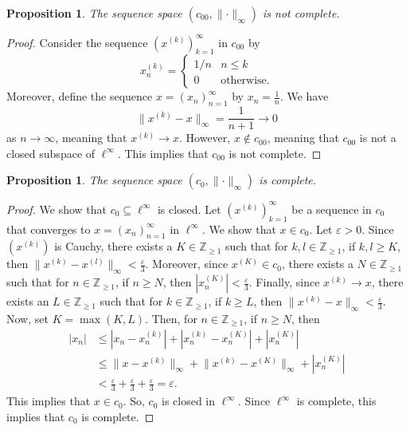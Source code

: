 \documentclass[a4paper, openany]{memoir}
\theoremstyle{definition}
\theoremstyle{plain}
\newtheorem{proposition}[definition]{Proposition}
\begin{document}
    \begin{proposition}
        The sequence space $(c_{00}, \lVert \cdot \rVert_\infty)$ is not complete.
    \end{proposition}
    \begin{proof}
        Consider the sequence $(x^{(k)})_{k=1}^\infty$ in $c_{00}$ by
        \[x^{(k)}_n = \begin{cases}
            1/n & n \leq k \\
            0 & \textrm{otherwise}.
        \end{cases}\]
        Moreover, define the sequence $x = (x_n)_{n=1}^\infty$ by $x_n = \frac{1}{n}$. We have
        \[\lVert x^{(k)} - x \rVert_\infty = \frac{1}{n+1} \to 0\]
        as $n \to \infty$, meaning that $x^{(k)} \to x$. However, $x \not\in c_{00}$, meaning that $c_{00}$ is not a closed subspace of $\ell^\infty$. This implies that $c_{00}$ is not complete.
    \end{proof}
    \begin{proposition}
        The sequence space $(c_0, \lVert \cdot \rVert_\infty)$ is complete.
    \end{proposition}
    \begin{proof}
        We show that $c_0 \subseteq \ell^\infty$ is closed. Let $(x^{(k)})_{k=1}^\infty$ be a sequence in $c_0$ that converges to $x = (x_n)_{n=1}^\infty$ in $\ell^\infty$. We show that $x \in c_0$. Let $\varepsilon > 0$. Since $(x^{(k)})$ is Cauchy, there exists a $K \in \mathbb{Z}_{\geq 1}$ such that for $k, l \in \mathbb{Z}_{\geq 1}$, if $k, l \geq K$, then $\lVert x^{(k)} - x^{(l)} \rVert_\infty < \frac{\varepsilon}{3}$. Moreover, since $x^{(K)} \in c_0$, there exists a $N \in \mathbb{Z}_{\geq 1}$ such that for $n \in \mathbb{Z}_{\geq 1}$, if $n \geq N$, then $|x^{(K)}_n| < \frac{\varepsilon}{3}$. Finally, since $x^{(k)} \to x$, there exists an $L \in \mathbb{Z}_{\geq 1}$ such that for $k \in \mathbb{Z}_{\geq 1}$, if $k \geq L$, then $\lVert x^{(k)} - x \rVert_\infty < \frac{\varepsilon}{3}$. Now, set $K = \max(K, L)$. Then, for $n \in \mathbb{Z}_{\geq 1}$, if $n \geq N$, then
        \begin{align*}
            |x_n| &\leq |x_n - x^{(k)}_n| + |x^{(k)}_n - x^{(K)}_n| + |x^{(K)}_n| \\
            &\leq \lVert x - x^{(k)} \rVert_\infty + \lVert x^{(k)} - x^{(K)} \rVert_\infty + |x^{(K)}_n| \\
            &< \frac{\varepsilon}{3} + \frac{\varepsilon}{3} + \frac{\varepsilon}{3} = \varepsilon.
        \end{align*}
        This implies that $x \in c_0$. So, $c_0$ is closed in $\ell^\infty$. Since $\ell^\infty$ is complete, this implies that $c_0$ is complete.
    \end{proof}
        
\end{document}
